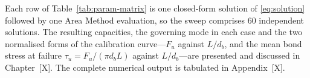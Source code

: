 Each row of Table~\ref{tab:param-matrix} is one closed-form solution of
\eqref{eq:solution} followed by one Area Method evaluation, so the sweep
comprises 60 independent solutions. The resulting capacities, the governing
mode in each case and the two normalised forms of the calibration
curve---$F_u$ against $L/d_b$, and the mean bond stress at failure
$\tau_u = F_u/(\pi d_b L)$ against $L/d_b$---are presented and discussed in
Chapter~[X]. The complete numerical output is tabulated in
Appendix~[X].